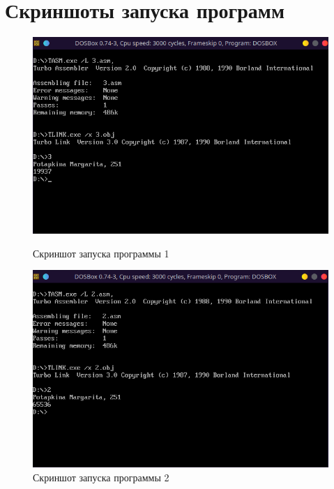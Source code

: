 \documentclass[bachelor, och, otchet]{SCWorks}
\begin{document}
\section{Скриншоты запуска программ}
\begin{figure}[H]
\centering
\includegraphics[scale=0.9]{1.png}
\caption {Скриншот запуска программы 1}
\includegraphics[scale=0.9]{2.png}
\caption {Скриншот запуска программы 2}
\end{figure}
\end{document}
